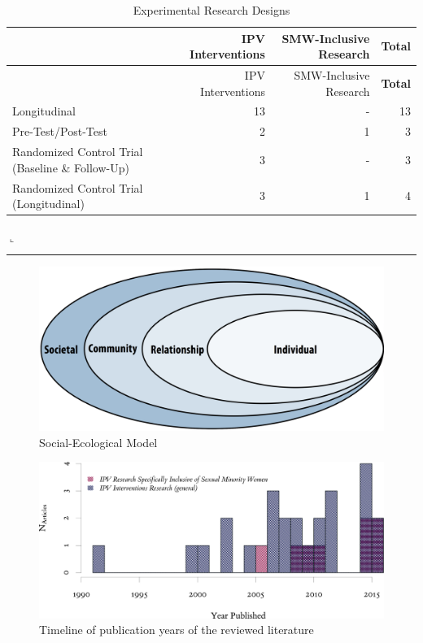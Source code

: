 \documentclass[11pt,]{tufte-book}
\newcommand{\Rerule}{
    \noindent
    \hspace{-1em}
    \textcolor{Rblue}{
        $\llcorner$\rule[-0.4mm]{\linewidth}{0.02mm}
    }
}
\begin{document}
\begin{longtable}[]{@{}lrrr@{}}
\caption{Experimental Research Designs \label{tbl:expp}}\tabularnewline
\toprule
& IPV Interventions & SMW-Inclusive Research &
\textbf{Total}\tabularnewline
\midrule
\endfirsthead
\toprule
& IPV Interventions & SMW-Inclusive Research &
\textbf{Total}\tabularnewline
\midrule
\endhead
Longitudinal & 13 & - & 13\tabularnewline
Pre-Test/Post-Test & 2 & 1 & 3\tabularnewline
Randomized Control Trial (Baseline \& Follow-Up) & 3 & - &
3\tabularnewline
Randomized Control Trial (Longitudinal) & 3 & 1 & 4\tabularnewline
\bottomrule
\end{longtable}

\Rerule
\newpage

\begin{figure}
\centering
\includegraphics{graphics/inputs/sem.png}
\caption{Social-Ecological Model\label{fig:sem}}
\end{figure}

\newpage

\begin{figure}
\centering
\includegraphics{graphics/inputs/yrhist.png}
\caption{Timeline of publication years of the reviewed
literature\label{fig:yrhist}}
\end{figure}

\newpage
\end{document}
